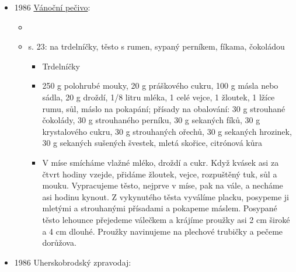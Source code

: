 \begin{itemize}
  \begin{itemize}
  \tightlist
  \item
    Malovaný kraj: národopisný a vlastivědný časopis Slovácka. Břeclav:
    Moraviapress, 1986(3), s. 7. ISSN 0323-1542.
  \item
    s. 7,  \emph{Styky rodiny Jurkovičovej s
    Luhačovicemi}
  \item
    zajímavý informace o Jurkovičových, hlavně o tom, kdo žil na Rusavě
  \item
    na Rusavě žila nejstarší dcera Samuela Jurkoviča, která se vdala za
    skalickýho rodáka Daniela Slobodu, byl botanik a pěstoval kulturní
    styky se Slovenskem
  \item
    nejmladší dcera Emília byla manželka Juraja Jurkoviča (tak proto jí
    zůstalo a jejím dětem zůstalo i to příjmení), její děti byli Dušan
    (architekt) a Emília s Annou, který působily na Slovácký búdě v
    Luhačovicích
  \end{itemize}
\item
  1986
  \href{https://ceskadigitalniknihovna.cz/uuid/uuid:9e7ab0f0-3a6b-11e4-8e0d-005056827e51}{Vánoční
  pečivo}:

  \begin{itemize}
  \tightlist
  \item
  \item
    s. 23:  na trdelníčky, těsto s rumen, sypaný
    perníkem, fíkama, čokoládou

    \begin{itemize}
    \tightlist
    \item
      Trdelníčky
    \item
      250 g polohrubé mouky, 20 g práškového cukru, 100 g másla nebo
      sádla, 20 g droždí, 1/8 litru mléka, 1 celé vejce, 1 žloutek, 1
      lžíce rumu, sůl, máslo na pokapání; přísady na obalování: 30 g
      strouhané čokolády, 30 g strouhaného perníku, 30 g sekaných fíků,
      30 g krystalového cukru, 30 g strouhaných ořechů, 30 g sekaných
      hrozinek, 30 g sekaných sušených švestek, mletá skořice, citrónová
      kůra
    \item
      V míse smícháme vlažné mléko, droždí a cukr. Když kvásek asi za
      čtvrt hodiny vzejde, přidáme žloutek, vejce, rozpuštěný tuk, sůl a
      mouku. Vypracujeme těsto, nejprve v míse, pak na vále, a necháme
      asi hodinu kynout. Z vykynutého těsta vyválíme placku, posypeme ji
      mletými a strouhanými přísadami a pokapeme máslem. Posypané těsto
      lehounce přejedeme válečkem a krájíme proužky asi 2 cm široké a 4
      cm dlouhé. Proužky navinujeme na plechové trubičky a pečeme
      dorůžova.
    \end{itemize}
  \end{itemize}
\item
  1986 Uherskobrodský zpravodaj:


\end{itemize}

